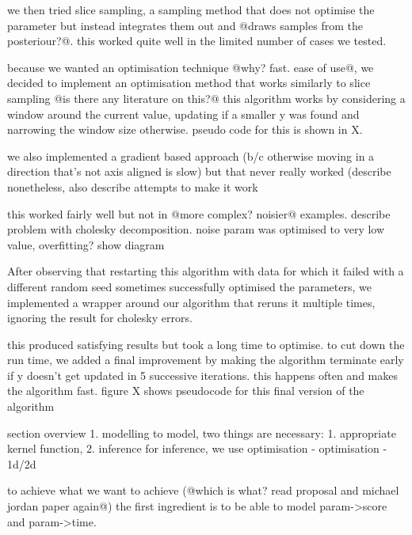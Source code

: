 \documentclass[a4paper,12pt,twoside,openright]{report}
\begin{document}

we then tried slice sampling, a sampling method that does not optimise the parameter but instead integrates them out and @draws samples from the posteriour?@. this worked quite well in the limited number of cases we tested.

because we wanted an optimisation technique @why? fast. ease of use@, we decided to implement an optimisation method that works similarly to slice sampling @is there any literature on this?@ this algorithm works by considering a window around the current value, updating if a smaller y was found and narrowing the window size otherwise. pseudo code for this is shown in X.

we also implemented a gradient based approach (b/c otherwise moving in a direction that's not axis aligned is slow) but that never really worked (describe nonetheless, also describe attempts to make it work

this worked fairly well but not in @more complex? noisier@ examples. describe problem with cholesky decomposition. noise param was optimised to very low value, overfitting? show diagram

After observing that restarting this algorithm with data for which it failed with a different random seed sometimes successfully optimised the parameters, we implemented a wrapper around our algorithm that reruns it multiple times, ignoring the result for cholesky errors.

this produced satisfying results but took a long time to optimise. to cut down the run time, we added a final improvement by making the algorithm terminate early if y doesn't get updated in 5 successive iterations. this happens often and makes the algorithm fast. figure X shows pseudocode for this final version of the algorithm







section overview
1. modelling
to model, two things are necessary: 1. appropriate kernel function, 2. inference
for inference, we use optimisation
- optimisation
- 1d/2d

to achieve what we want to achieve (@which is what? read proposal and michael jordan paper again@) the first ingredient is to be able to model param->score and param->time.
\end{document}
